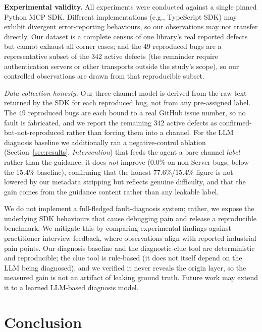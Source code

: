 \textbf{Experimental validity.} All experiments were conducted against a single pinned Python
MCP SDK. Different implementations (e.g., TypeScript SDK) may exhibit divergent error-reporting
behaviours, so our observations may not transfer directly. Our dataset is a complete census of
one library's real reported defects but cannot exhaust all corner cases; and the 49 reproduced
bugs are a representative subset of the 342 active defects (the remainder require
authentication servers or other transports outside the study's scope), so our controlled
observations are drawn from that reproducible subset.

\emph{Data-collection honesty.} Our three-channel model is derived from the raw text returned
by the SDK for each reproduced bug, not from any pre-assigned label. The 49 reproduced bugs are
each bound to a real GitHub issue number, so no fault is fabricated, and we report the remaining
342 active defects as confirmed-but-not-reproduced rather than forcing them into a channel. For
the LLM diagnosis baseline we additionally ran a negative-control ablation
(Section~\ref{sec:results}, \emph{Intervention}) that feeds the agent a bare channel \emph{label}
rather than the guidance; it does \emph{not} improve (0.0\% on non-Server bugs, below the 15.4\%
baseline), confirming that the honest 77.6\%/15.4\% figure is not lowered by our metadata
stripping but reflects genuine difficulty, and that the gain comes from the guidance content
rather than any leakable label.

We do not implement a full-fledged fault-diagnosis system; rather, we expose the underlying
SDK behaviours that cause debugging pain and release a reproducible benchmark. We mitigate
this by comparing experimental findings against practitioner interview feedback, where
observations align with reported industrial pain points. Our diagnosis baseline and the
diagnostic-clue tool are deterministic and reproducible; the clue tool is rule-based (it does
not itself depend on the LLM being diagnosed), and we verified it never reveals the origin
layer, so the measured gain is not an artifact of leaking ground truth. Future work may extend
it to a learned LLM-based diagnosis model.

\section{Conclusion}\label{sec:concl}

